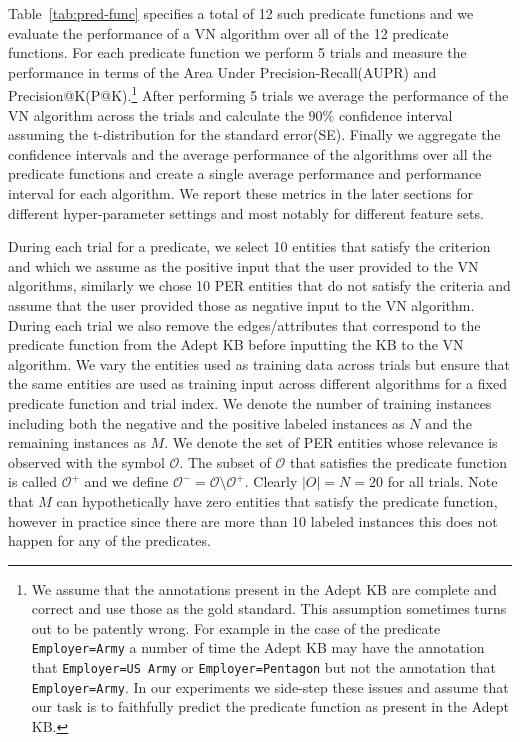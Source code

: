 \documentclass[paper=a4,fontsize=11pt]{scrartcl}
\newcommand{\Tabref}[1]{Table~\ref{#1}}
\numberwithin{equation}{section}    %
\numberwithin{figure}{section}      %
\numberwithin{table}{section}       %
\begin{document}
\Tabref{tab:pred-func} specifies a total of 12 such predicate functions and we
evaluate the performance of a VN algorithm over all of the 12 predicate
functions. For each predicate function we perform 5 trials and measure the
performance in terms of the Area Under Precision-Recall(AUPR) and
Precision@K(P@K).\footnote{We assume that the annotations present in the Adept
KB are complete and correct and use those as the gold standard. This assumption
sometimes turns out to be patently wrong. For example in the case of the
predicate \texttt{Employer=Army} a number of time the Adept KB may have the
annotation that \texttt{Employer=US Army} or \texttt{Employer=Pentagon} but not
the annotation that \texttt{Employer=Army}. In our experiments we side-step
these issues and assume that our task is to faithfully predict the predicate
function as present in the Adept KB.} After performing 5 trials we average the
performance of the VN algorithm across the trials and calculate the $90\%$
confidence interval assuming the t-distribution for the standard
error(SE). Finally we aggregate the confidence intervals and the average
performance of the algorithms over all the predicate functions and create a
single average performance and performance interval for each algorithm. We
report these metrics in the later sections for different hyper-parameter
settings and most notably for different feature sets.

During each trial for a predicate, we select 10 entities that satisfy the
criterion and which we assume as the positive input that the user provided to
the VN algorithms, similarly we chose 10 \textsc{PER} entities that do not
satisfy the criteria and assume that the user provided those as negative input
to the VN algorithm. During each trial we also remove the edges/attributes that
correspond to the predicate function from the Adept KB before inputting the KB
to the VN algorithm.  We vary the entities used as training data across trials
but ensure that the same entities are used as training input across different
algorithms for a fixed predicate function and trial index. We denote the number
of training instances including both the negative and the positive labeled
instances as $N$ and the remaining instances as $M$.  We denote the set of
\textsc{PER} entities whose relevance is observed with the symbol
$\mathcal{O}$.
The subset of $\mathcal{O}$ that satisfies the predicate function is called
$\mathcal{O}^{+}$ and we define $\mathcal{O}^{-} = \mathcal{O} \setminus \mathcal{O}^{+}$.
Clearly $\vert O \vert = N=20$ for all trials.  Note that $M$ can
hypothetically have zero entities that satisfy the predicate function, however
in practice since there are more than 10 labeled instances this does not happen
for any of the predicates.
\end{document}
